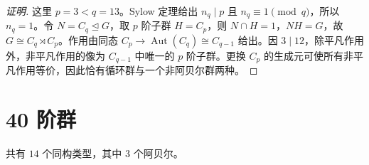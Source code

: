 \documentclass[UTF8,fontset=fandol,11pt,a4paper]{ctexart}
\newcommand{\Aut}{\operatorname{Aut}}\newcommand{\GL}{\operatorname{GL}}\newcommand{\ord}{\operatorname{ord}}\newcommand{\Z}{\mathrm Z}
\begin{document}
\begin{proof}[证明]
这里 $p=3<q=13$。Sylow 定理给出 $n_q\mid p$ 且 $n_q\equiv1\pmod q$，所以 $n_q=1$。令 $N=C_q\trianglelefteq G$，取 $p$ 阶子群 $H=C_p$，则 $N\cap H=1$，$NH=G$，故 $G\cong C_q\rtimes C_p$。作用由同态 $C_p\to\Aut(C_q)\cong C_{q-1}$ 给出。因 $3\mid 12$，除平凡作用外，非平凡作用的像为 $C_{q-1}$ 中唯一的 $p$ 阶子群。更换 $C_p$ 的生成元可使所有非平凡作用等价，因此恰有循环群与一个非阿贝尔群两种。
\end{proof}

\section*{40 阶群}\label{order:40}

共有 $14$ 个同构类型，其中 $3$ 个阿贝尔。

\begingroup\small\setlength{\tabcolsep}{3pt}\renewcommand{\arraystretch}{1.12}
\end{document}
